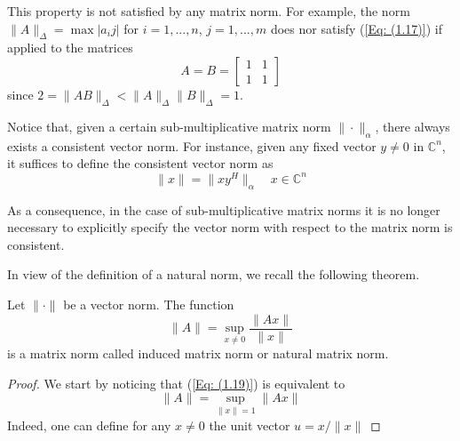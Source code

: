 This property is not satisfied by any matrix norm. For example, the norm $ \|A\|_\Delta = \max{|a_ij|}$ for $i = 1, ..., n$, $j = 1, ..., m$ does nor satisfy (\ref{Eq: (1.17)}) if applied to the matrices
\[ A = B = \begin{bmatrix}
    1 & 1 \\
    1 & 1
\end{bmatrix} \]
since $2 = \|AB\|_\Delta < \|A\|_\Delta \|B\|_\Delta = 1$.

Notice that, given a certain sub-multiplicative matrix norm $\|\cdot\|_\alpha$, there always exists a consistent vector norm. For instance, given any fixed vector $y \neq 0$ in $\mathbb{C}^n$, it suffices to define the consistent vector norm as
\[ \|x\| = \| x y^H \|_\alpha \quad x \in \mathbb{C}^n\]

As a consequence, in the case of sub-multiplicative matrix norms it is no longer necessary to explicitly specify the vector norm with respect to the matrix norm is consistent.

In view of the definition of a natural norm, we recall the following theorem.

\begin{theorem}
    Let $\| \cdot \|$ be a vector norm. The function
    \begin{equation}
        \| A \| = \sup_{x \neq 0}{\frac{\| Ax \|}{\|x\|}}
        \label{Eq: (1.19)}
    \end{equation}
    is a matrix norm called induced matrix norm or natural matrix norm.
\end{theorem}

\begin{proof}
    We start by noticing that (\ref{Eq: (1.19)}) is equivalent to 
    \begin{equation}
        \|A\| = \sup_{\|x\| = 1}{\|Ax\|}
        \label{Eq: (1.20)}
    \end{equation}
    Indeed, one can define for any $x \neq 0 $ the unit vector $u = x / \|x\|$
\end{proof}
